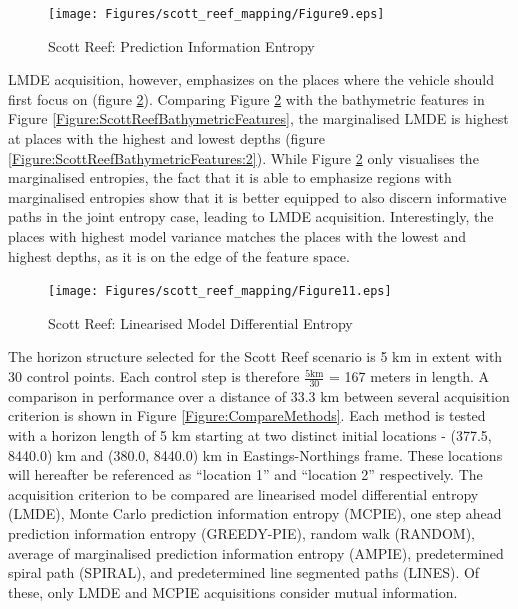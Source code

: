 			\begin{figure}[!htbp]
			\centering
				\texttt{[image: Figures/scott\_reef\_mapping/Figure9.eps]}
			\caption{Scott Reef: Prediction Information Entropy}
			\label{Figure:ScottReefPredictionInformationEntropy}
			\end{figure}
			
			LMDE acquisition, however, emphasizes on the places where the vehicle should first focus on (figure \ref{Figure:ScottReefLinearisedModelDifferentialEntropy}). Comparing Figure \ref{Figure:ScottReefLinearisedModelDifferentialEntropy} with the bathymetric features in Figure \ref{Figure:ScottReefBathymetricFeatures}, the marginalised LMDE is highest at places with the highest and lowest depths (figure \ref{Figure:ScottReefBathymetricFeatures:2}). While Figure \ref{Figure:ScottReefLinearisedModelDifferentialEntropy} only visualises the marginalised entropies, the fact that it is able to emphasize regions with marginalised entropies show that it is better equipped to also discern informative paths in the joint entropy case, leading to LMDE acquisition. Interestingly, the places with highest model variance matches the places with the lowest and highest depths, as it is on the edge of the feature space.
			
			\begin{figure}[!htbp]
			\centering
				\texttt{[image: Figures/scott\_reef\_mapping/Figure11.eps]}
			\caption{Scott Reef: Linearised Model Differential Entropy}
			\label{Figure:ScottReefLinearisedModelDifferentialEntropy}
			\end{figure}
		
			The horizon structure selected for the Scott Reef scenario is 5 km in extent with 30 control points. Each control step is therefore $\frac{5 \mathrm{km}}{30}$ = 167 meters in length.  A comparison in performance over a distance of 33.3 km between several acquisition criterion is shown in Figure \ref{Figure:CompareMethods}. Each method is tested with a horizon length of 5 km starting at two distinct initial locations - (377.5, 8440.0) km and (380.0, 8440.0) km in Eastings-Northings frame. These locations will hereafter be referenced as ``location 1'' and ``location 2'' respectively. The acquisition criterion to be compared are linearised model differential entropy (LMDE), Monte Carlo prediction information entropy (MCPIE), one step ahead prediction information entropy (GREEDY-PIE), random walk (RANDOM), average of marginalised prediction information entropy (AMPIE), predetermined spiral path (SPIRAL), and predetermined line segmented paths (LINES). Of these, only LMDE and MCPIE acquisitions consider mutual information.
		
